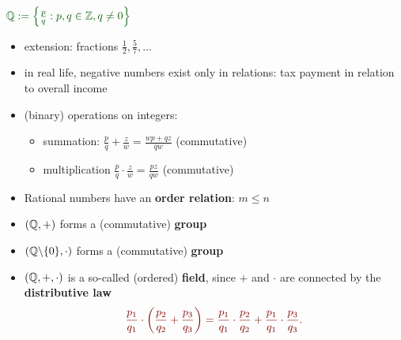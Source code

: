 {\begin{frame}
\vspace{0.5cm}
$\color{defgruen}\Q:=\left\lbrace \frac{p}{q}: p,q\in\Z, q\neq 0\right\rbrace $
\vspace{0.5cm}
\begin{itemize}
	\item extension: fractions $\frac{1}{2},\frac{5}{7},... $
	\item in real life, negative numbers exist only in relations: tax payment in relation to overall income
	\item (binary) operations on integers:
	\begin{itemize} \normalsize
		\item summation: $\frac{p}{q} + \frac{z}{w} = \frac{wp + qz}{qw}$ (commutative)
		\item multiplication $\frac{p}{q} \cdot \frac{z}{w} = \frac{pz}{qw}$ (commutative)
	\end{itemize}
	\item Rational numbers have an \textbf{order relation}: $m\le n$
	\item $({\mathbb{Q}}, +)$ forms a (commutative) \textbf{group}
	\item $({\mathbb{Q}}\backslash \{0\}, \cdot)$ forms a (commutative) \textbf{group} 
	
	\item $({\mathbb{Q}},+, \cdot)$ is a so-called (ordered) \textbf{field}, since $+$ and $\cdot$ are connected by the \textbf{distributive law}
	\[\color{satzrot}
	\frac{p_1}{q_1}\cdot \left(\frac{p_2}{q_2}+\frac{p_3}{q_3}\right)=
	\frac{p_1}{q_1}\cdot \frac{p_2}{q_2}+\frac{p_1}{q_1}\cdot \frac{p_3}{q_3}.
	\]	
\end{itemize}
\end{frame}

}
